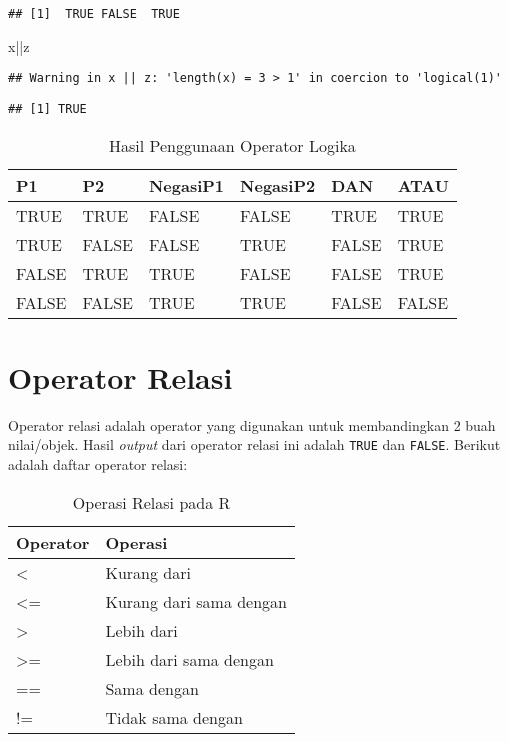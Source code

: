 \documentclass[
]{book}
\newenvironment{Shaded}{\begin{snugshade}}{\end{snugshade}}
\newcommand{\NormalTok}[1]{#1}
\newcommand{\SpecialCharTok}[1]{\textcolor[rgb]{0.00,0.00,0.00}{#1}}
\begin{document}
\begin{verbatim}
## [1]  TRUE FALSE  TRUE
\end{verbatim}

\begin{Shaded}
\begin{Highlighting}[]
\NormalTok{x}\SpecialCharTok{||}\NormalTok{z}
\end{Highlighting}
\end{Shaded}

\begin{verbatim}
## Warning in x || z: 'length(x) = 3 > 1' in coercion to 'logical(1)'
\end{verbatim}

\begin{verbatim}
## [1] TRUE
\end{verbatim}

\begin{table}

\caption{\label{tab:unnamed-chunk-28}Hasil Penggunaan Operator Logika}
\centering
\begin{tabular}[t]{llllll}
\toprule
P1 & P2 & NegasiP1 & NegasiP2 & DAN & ATAU\\
\midrule
TRUE & TRUE & FALSE & FALSE & TRUE & TRUE\\
TRUE & FALSE & FALSE & TRUE & FALSE & TRUE\\
FALSE & TRUE & TRUE & FALSE & FALSE & TRUE\\
FALSE & FALSE & TRUE & TRUE & FALSE & FALSE\\
\bottomrule
\end{tabular}
\end{table}

\hypertarget{relational}{%
\section{Operator Relasi}\label{relational}}

Operator relasi adalah operator yang digunakan untuk membandingkan 2 buah nilai/objek. Hasil \emph{output} dari operator relasi ini adalah \texttt{TRUE} dan \texttt{FALSE}. Berikut adalah daftar operator relasi:

\begin{table}

\caption{\label{tab:unnamed-chunk-29}Operasi Relasi pada R}
\centering
\begin{tabular}[t]{ll}
\toprule
Operator & Operasi\\
\midrule
< & Kurang dari\\
<= & Kurang dari sama dengan\\
> & Lebih dari\\
>= & Lebih dari sama dengan\\
== & Sama dengan\\
\addlinespace
!= & Tidak sama dengan\\
\bottomrule
\end{tabular}
\end{table}
\end{document}
